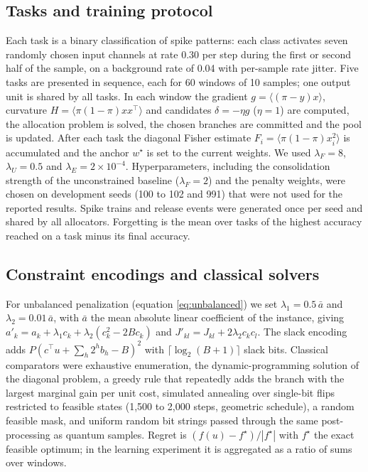 \subsection*{Tasks and training protocol}
Each task is a binary classification of spike patterns: each class activates seven randomly chosen input channels at rate 0.30 per step during the first or second half of the sample, on a background rate of 0.04 with per-sample rate jitter. Five tasks are presented in sequence, each for 60 windows of 10 samples; one output unit is shared by all tasks. In each window the gradient $g=\langle(\pi-y)x\rangle$, curvature $H=\langle\pi(1-\pi)xx^{\top}\rangle$ and candidates $\delta=-\eta g$ ($\eta=1$) are computed, the allocation problem is solved, the chosen branches are committed and the pool is updated. After each task the diagonal Fisher estimate $F_{i}=\langle\pi(1-\pi)x_{i}^{2}\rangle$ is accumulated and the anchor $w^{\star}$ is set to the current weights. We used $\lambda_{F}=8$, $\lambda_{U}=0.5$ and $\lambda_{E}=2\times10^{-4}$. Hyperparameters, including the consolidation strength of the unconstrained baseline ($\lambda_{F}=2$) and the penalty weights, were chosen on development seeds (100 to 102 and 991) that were not used for the reported results. Spike trains and release events were generated once per seed and shared by all allocators. Forgetting is the mean over tasks of the highest accuracy reached on a task minus its final accuracy.

\subsection*{Constraint encodings and classical solvers}
For unbalanced penalization (equation \eqref{eq:unbalanced}) we set $\lambda_{1}=0.5\,\bar a$ and $\lambda_{2}=0.01\,\bar a$, with $\bar a$ the mean absolute linear coefficient of the instance, giving $a'_{k}=a_{k}+\lambda_{1}c_{k}+\lambda_{2}(c_{k}^{2}-2Bc_{k})$ and $J'_{kl}=J_{kl}+2\lambda_{2}c_{k}c_{l}$. The slack encoding adds $P(c^{\top}u+\sum_{h}2^{h}b_{h}-B)^{2}$ with $\lceil\log_{2}(B+1)\rceil$ slack bits. Classical comparators were exhaustive enumeration, the dynamic-programming solution of the diagonal problem, a greedy rule that repeatedly adds the branch with the largest marginal gain per unit cost, simulated annealing over single-bit flips restricted to feasible states (1,500 to 2,000 steps, geometric schedule), a random feasible mask, and uniform random bit strings passed through the same post-processing as quantum samples. Regret is $(f(u)-f^{\star})/|f^{\star}|$ with $f^{\star}$ the exact feasible optimum; in the learning experiment it is aggregated as a ratio of sums over windows.

